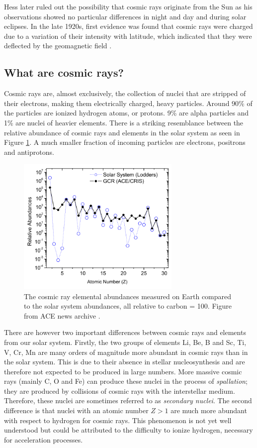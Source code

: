 Hess later ruled out the possibility that cosmic rays originate from the Sun as his observations showed no particular differences in night and day and during solar eclipses. In the late 1920s, first evidence was found that cosmic rays were charged due to a variation of their intensity with latitude, which indicated that they were deflected by the geomagnetic field \cite{clay:1927a}.

\subsection{What are cosmic rays?}
\label{subsec:whatarecosmicrays}
Cosmic rays are, almost exclusively, the collection of nuclei that are stripped of their electrons, making them electrically charged, heavy particles. Around 90\% of the particles are ionized hydrogen atoms, or protons. 9\% are alpha particles and 1\% are nuclei of heavier elements. There is a striking resemblance between the relative abundance of cosmic rays and elements in the solar system as seen in Figure \ref{fig:relabundance}. A much smaller fraction of incoming particles are electrons, positrons and antiprotons.

\begin{figure}
\centering
\includegraphics[width=0.7\textwidth]{./chapter3/img/relativeabundanceACE.png}
\caption{The cosmic ray elemental abundances measured on Earth compared to the solar system abundances, all relative to carbon = 100. Figure from ACE news archive \cite{ISRAEL2005201}.}
\label{fig:relabundance}
\end{figure}
There are however two important differences between cosmic rays and elements from our solar system. Firstly, the two groups of elements Li, Be, B and Sc, Ti, V, Cr, Mn are many orders of magnitude more abundant in cosmic rays than in the solar system. This is due to their absence in stellar nucleosynthesis and are therefore not expected to be produced in large numbers. More massive cosmic rays (mainly C, O and Fe) can produce these nuclei in the process of \textit{spallation}; they are produced by collisions of cosmic rays with the interstellar medium. Therefore, these nuclei are sometimes referred to as \textit{secondary nuclei}.
The second difference is that nuclei with an atomic number $Z>1$ are much more abundant with respect to hydrogen for cosmic rays. This phenomenon is not yet well understood but could be attributed to the difficulty to ionize hydrogen, necessary for acceleration processes.

